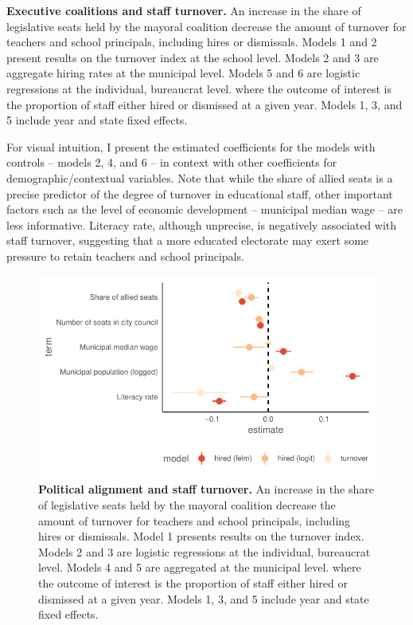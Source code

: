 \documentclass[12pt,a4paper]{article}
\begin{document}
\begin{landscape}
    \begin{table}[t]
      \centering
      \footnotesize
      
      \caption{{\bf Executive coalitions and staff turnover.} An increase in the share of legislative seats held by the mayoral coalition decrease the amount of turnover for teachers and school principals, including hires or dismissals. Models 1 and 2 present results on the turnover index at the school level. Models 2 and 3 are aggregate hiring rates at the municipal level. Models 5 and 6 are logistic regressions at the individual, bureaucrat level. where the outcome of interest is the proportion of staff either hired or dismissed at a given year. Models 1, 3, and 5 include year and state fixed effects.}
      \label{tbl:turnover}
    \end{table}
\end{landscape}

For visual intuition, I present the estimated coefficients for the models with controls -- models 2, 4, and 6 -- in context with other coefficients for demographic/contextual variables. Note that while the share of allied seats is a precise predictor of the degree of turnover in educational staff, other important factors such as the level of economic development -- municipal median wage -- are less informative. Literacy rate, although unprecise, is negatively associated with staff turnover, suggesting that a more educated electorate may exert some pressure to retain teachers and school principals. 

\begin{figure}[h]
    \centering
    \includegraphics[width=0.6\linewidth]{plots/plot_coalition_coef_mun.pdf}
    \caption{{\bf Political alignment and staff turnover.} An increase in the share of legislative seats held by the mayoral coalition decrease the amount of turnover for teachers and school principals, including hires or dismissals. Model 1 presents results on the turnover index. Models 2 and 3 are logistic regressions at the individual, bureaucrat level. Models 4 and 5 are aggregated at the municipal level. where the outcome of interest is the proportion of staff either hired or dismissed at a given year. Models 1, 3, and 5 include year and state fixed effects.}
    \label{fig:coalition_turnover}
\end{figure}
\end{document}
